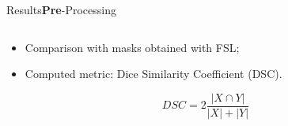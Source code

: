 \documentclass[]{standalone}
\begin{document}
	\begin{frame}{Results}{\textbf{Pre}-Processing}
	\vspace{-28pt}
	
	\begin{columns}
		\begin{column}{0.35\textwidth}
		\begin{itemize}
	
		\item Comparison with masks obtained with FSL;
		\item Computed metric: Dice Similarity Coefficient (DSC).
	\end{itemize}
	
		\begin{equation*}
			    DSC = 2\frac{|X \cap Y |}{|X| + |Y|}
		\end{equation*}
		\end{column}
		

\end{columns}
\end{frame}
\end{document}
